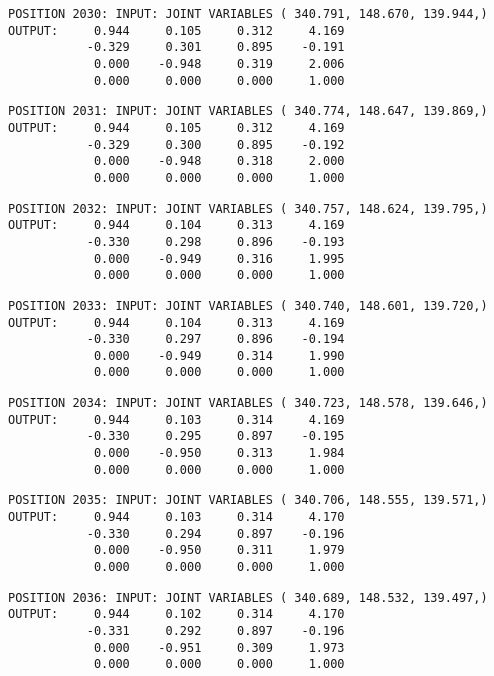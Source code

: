 \begin{verbatim}
POSITION 2030: INPUT: JOINT VARIABLES ( 340.791, 148.670, 139.944,)
OUTPUT:     0.944     0.105     0.312     4.169
           -0.329     0.301     0.895    -0.191
            0.000    -0.948     0.319     2.006
            0.000     0.000     0.000     1.000
\end{verbatim} \pagebreak[1]\begin{verbatim}
POSITION 2031: INPUT: JOINT VARIABLES ( 340.774, 148.647, 139.869,)
OUTPUT:     0.944     0.105     0.312     4.169
           -0.329     0.300     0.895    -0.192
            0.000    -0.948     0.318     2.000
            0.000     0.000     0.000     1.000
\end{verbatim} \pagebreak[1]\begin{verbatim}
POSITION 2032: INPUT: JOINT VARIABLES ( 340.757, 148.624, 139.795,)
OUTPUT:     0.944     0.104     0.313     4.169
           -0.330     0.298     0.896    -0.193
            0.000    -0.949     0.316     1.995
            0.000     0.000     0.000     1.000
\end{verbatim} \pagebreak[1]\begin{verbatim}
POSITION 2033: INPUT: JOINT VARIABLES ( 340.740, 148.601, 139.720,)
OUTPUT:     0.944     0.104     0.313     4.169
           -0.330     0.297     0.896    -0.194
            0.000    -0.949     0.314     1.990
            0.000     0.000     0.000     1.000
\end{verbatim} \pagebreak[1]\begin{verbatim}
POSITION 2034: INPUT: JOINT VARIABLES ( 340.723, 148.578, 139.646,)
OUTPUT:     0.944     0.103     0.314     4.169
           -0.330     0.295     0.897    -0.195
            0.000    -0.950     0.313     1.984
            0.000     0.000     0.000     1.000
\end{verbatim} \pagebreak[1]\begin{verbatim}
POSITION 2035: INPUT: JOINT VARIABLES ( 340.706, 148.555, 139.571,)
OUTPUT:     0.944     0.103     0.314     4.170
           -0.330     0.294     0.897    -0.196
            0.000    -0.950     0.311     1.979
            0.000     0.000     0.000     1.000
\end{verbatim} \pagebreak[1]\begin{verbatim}
POSITION 2036: INPUT: JOINT VARIABLES ( 340.689, 148.532, 139.497,)
OUTPUT:     0.944     0.102     0.314     4.170
           -0.331     0.292     0.897    -0.196
            0.000    -0.951     0.309     1.973
            0.000     0.000     0.000     1.000
\end{verbatim} \pagebreak[1]\begin{verbatim}

\end{verbatim}
